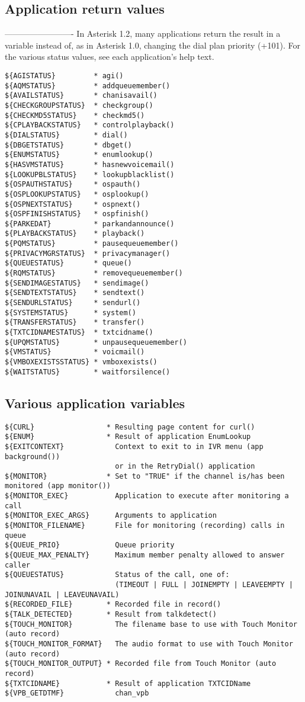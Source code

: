 \subsection{Application return values}
-------------------------
In Asterisk 1.2, many applications return the result in a variable
instead of, as in Asterisk 1.0, changing the dial plan priority (+101).
For the various status values, see each application's help text.
\begin{verbatim}
${AGISTATUS}         * agi()
${AQMSTATUS}         * addqueuemember()
${AVAILSTATUS}       * chanisavail()
${CHECKGROUPSTATUS}  * checkgroup()
${CHECKMD5STATUS}    * checkmd5()
${CPLAYBACKSTATUS}   * controlplayback()
${DIALSTATUS}        * dial()
${DBGETSTATUS}       * dbget()
${ENUMSTATUS}        * enumlookup()
${HASVMSTATUS}       * hasnewvoicemail()
${LOOKUPBLSTATUS}    * lookupblacklist()
${OSPAUTHSTATUS}     * ospauth()
${OSPLOOKUPSTATUS}   * osplookup()
${OSPNEXTSTATUS}     * ospnext()
${OSPFINISHSTATUS}   * ospfinish()
${PARKEDAT}          * parkandannounce()
${PLAYBACKSTATUS}    * playback()
${PQMSTATUS}         * pausequeuemember()
${PRIVACYMGRSTATUS}  * privacymanager()
${QUEUESTATUS}       * queue()
${RQMSTATUS}         * removequeuemember()
${SENDIMAGESTATUS}   * sendimage()
${SENDTEXTSTATUS}    * sendtext()
${SENDURLSTATUS}     * sendurl()
${SYSTEMSTATUS}      * system()
${TRANSFERSTATUS}    * transfer()
${TXTCIDNAMESTATUS}  * txtcidname()
${UPQMSTATUS}        * unpausequeuemember()
${VMSTATUS}          * voicmail()
${VMBOXEXISTSSTATUS} * vmboxexists()
${WAITSTATUS}        * waitforsilence()
\end{verbatim}

\subsection{Various application variables}
\begin{verbatim}
${CURL}                 * Resulting page content for curl()
${ENUM}                 * Result of application EnumLookup
${EXITCONTEXT}            Context to exit to in IVR menu (app background())
                          or in the RetryDial() application
${MONITOR}              * Set to "TRUE" if the channel is/has been monitored (app monitor())
${MONITOR_EXEC}           Application to execute after monitoring a call
${MONITOR_EXEC_ARGS}      Arguments to application
${MONITOR_FILENAME}       File for monitoring (recording) calls in queue
${QUEUE_PRIO}             Queue priority
${QUEUE_MAX_PENALTY}      Maximum member penalty allowed to answer caller
${QUEUESTATUS}            Status of the call, one of:
                          (TIMEOUT | FULL | JOINEMPTY | LEAVEEMPTY | JOINUNAVAIL | LEAVEUNAVAIL)
${RECORDED_FILE}        * Recorded file in record()
${TALK_DETECTED}        * Result from talkdetect()
${TOUCH_MONITOR}          The filename base to use with Touch Monitor (auto record)
${TOUCH_MONITOR_FORMAT}   The audio format to use with Touch Monitor (auto record)
${TOUCH_MONITOR_OUTPUT} * Recorded file from Touch Monitor (auto record)
${TXTCIDNAME}           * Result of application TXTCIDName
${VPB_GETDTMF}            chan_vpb
\end{verbatim}


